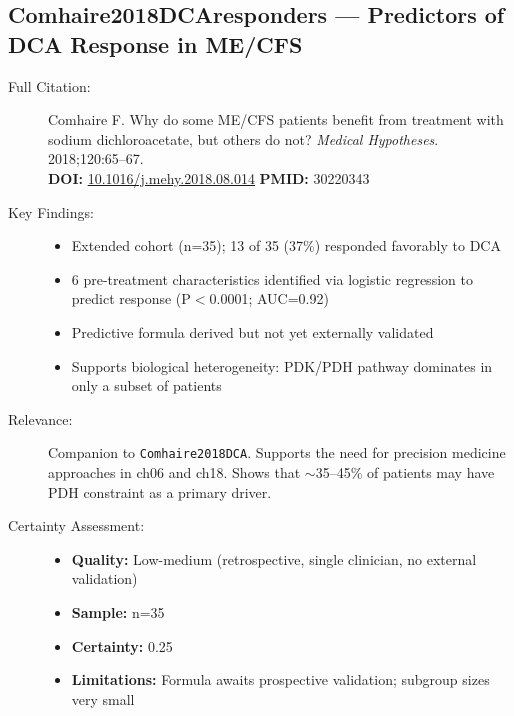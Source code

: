 \subsection*{Comhaire2018DCAresponders --- Predictors of DCA Response in ME/CFS}
\begin{description}
    \item[Full Citation:] Comhaire F. Why do some ME/CFS patients benefit from treatment with sodium dichloroacetate, but others do not? \textit{Medical Hypotheses}. 2018;120:65--67.\\
    \textbf{DOI:} \href{https://doi.org/10.1016/j.mehy.2018.08.014}{10.1016/j.mehy.2018.08.014} \quad \textbf{PMID:} 30220343
    \item[Key Findings:]
    \begin{itemize}
        \item Extended cohort (n=35); 13 of 35 (37\%) responded favorably to DCA
        \item 6 pre-treatment characteristics identified via logistic regression to predict response (P$<$0.0001; AUC=0.92)
        \item Predictive formula derived but not yet externally validated
        \item Supports biological heterogeneity: PDK/PDH pathway dominates in only a subset of patients
    \end{itemize}
    \item[Relevance:] Companion to \texttt{Comhaire2018DCA}. Supports the need for precision medicine approaches in ch06 and ch18. Shows that $\sim$35--45\% of patients may have PDH constraint as a primary driver.
    \item[Certainty Assessment:]
    \begin{itemize}
        \item \textbf{Quality:} Low-medium (retrospective, single clinician, no external validation)
        \item \textbf{Sample:} n=35
        \item \textbf{Certainty:} 0.25
        \item \textbf{Limitations:} Formula awaits prospective validation; subgroup sizes very small
    \end{itemize}
\end{description}

